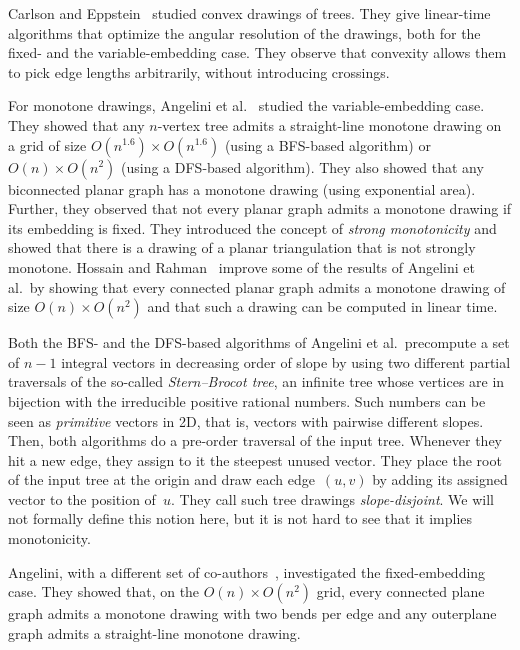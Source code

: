 \documentclass[a4paper,11pt]{article}
\theoremstyle{plain}
\begin{document}
Carlson and Eppstein~\cite{ce-tcfoa-GD06} studied convex drawings of
trees.  They give linear-time algorithms that optimize the angular
resolution of the drawings, both for the fixed- and the
variable-embedding case.  They observe that convexity allows them to
pick edge lengths arbitrarily, without introducing crossings.

For monotone drawings, Angelini et al.~\cite{acbfp-mdg-12} studied the
variable-embed\-ding case.  They showed that any $n$-vertex tree admits
a straight-line monotone drawing on a grid of size $O(n^{1.6}) \times
O(n^{1.6})$ (using a BFS-based algorithm) or $O(n) \times O(n^2)$
(using a DFS-based algorithm).  They also showed that any biconnected
planar graph has a monotone drawing (using exponential area).
Further, they observed that not every planar graph admits a monotone
drawing if its embedding is fixed.  They introduced the concept of
\emph{strong monotonicity} and showed that there is a drawing of a
planar triangulation that is not strongly monotone.  Hossain and
Rahman~\cite{hr-mgdpg-FAW14} improve some of the results of Angelini
et al.\ by showing that every connected planar graph
admits a monotone drawing of size $O(n) \times O(n^2)$ and that such a
drawing can be computed in linear time. 

Both the BFS- and the DFS-based algorithms of Angelini et al.\
precompute a set of $n-1$ integral vectors in decreasing order 
of slope by using two different partial traversals of the
so-called \emph{Stern--Brocot tree}, an infinite tree whose vertices are in
bijection with the irreducible positive rational numbers.  Such
numbers can be seen as \emph{primitive} vectors in 2D, that is,
vectors with pairwise different slopes.  Then, both algorithms do a
pre-order traversal of the input tree.  Whenever they
hit a new edge, they assign to it the steepest unused vector.  They
place the root of the input tree at the origin and draw each
edge~$(u,v)$ by adding its assigned vector to the position
of~$u$.  They call such tree drawings \emph{slope-disjoint}.  We will not
formally define this notion here, but it is not hard to see that it
implies monotonicity.  

Angelini, with a different set of co-authors~\cite{adkmrsw-mdgfe-A15},
investigated the fixed-embedding case.  They showed that, on the
$O(n) \times O(n^2)$ grid, every connected plane graph admits a
monotone drawing with two bends per edge and any outerplane graph
admits a straight-line monotone drawing.
\end{document}
